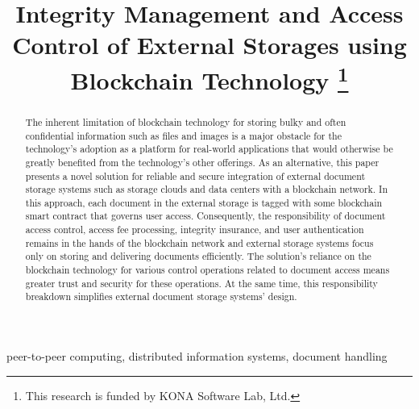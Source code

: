 \documentclass[conference]{IEEEtran}
\begin{document}
\title{Integrity Management and Access Control of External Storages using Blockchain Technology 
	\thanks{This research is funded by KONA Software Lab, Ltd.}
}

\author{
	\and
}
\maketitle

\begin{abstract}
The inherent limitation of blockchain technology for storing bulky and often confidential information such as files and images is a major obstacle for the technology's adoption as a platform for real-world applications that would otherwise be greatly benefited from the technology's other offerings. As an alternative, this paper presents a novel solution for reliable and secure integration of external document storage systems such as storage clouds and data centers with a blockchain network. In this approach, each document in the external storage is tagged with some blockchain smart contract that governs user access. Consequently, the responsibility of document access control, access fee processing, integrity insurance, and user authentication remains in the hands of the blockchain network and external storage systems focus only on storing and delivering documents efficiently. The solution's reliance on the blockchain technology for various control operations related to document access means greater trust and security for these operations. At the same time, this responsibility breakdown simplifies external document storage systems' design.    
\end{abstract}

\begin{IEEEkeywords}
peer-to-peer computing, distributed information systems, document handling  
\end{IEEEkeywords}


\end{document}
